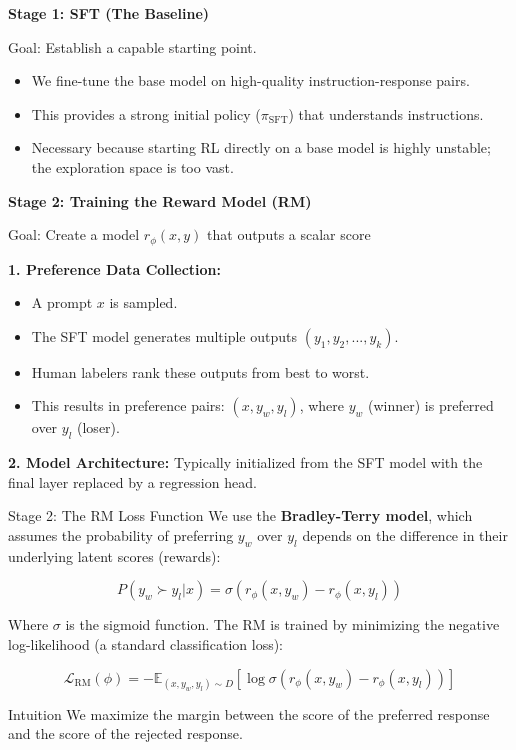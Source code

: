 \documentclass[xcolor=svgnames, 10pt, handout]{beamer}
\begin{document}
\begin{frame}{}
\textbf{Stage 1: SFT (The Baseline)}
    \begin{block}{Goal: Establish a capable starting point.}
       \pause
    \begin{itemize}
        \item We fine-tune the base model on high-quality instruction-response pairs.
        \pause
        \item This provides a strong initial policy ($\pi_{\text{SFT}}$) that understands instructions.
        \pause
        \item Necessary because starting RL directly on a base model is highly unstable; the exploration space is too vast.
    \end{itemize}
    \end{block}

\textbf{Stage 2: Training the Reward Model (RM)}
    \begin{block}{Goal: Create a model $r_\phi(x, y)$ that outputs a scalar score}
    \pause

    \textbf{1. Preference Data Collection:}
    \begin{itemize}
        \item A prompt $x$ is sampled.
        \pause
        \item The SFT model generates multiple outputs $(y_1, y_2, ..., y_k)$.
        \pause
        \item Human labelers rank these outputs from best to worst.
        \pause
        \item This results in preference pairs: $(x, y_w, y_l)$, where $y_w$ (winner) is preferred over $y_l$ (loser).
    \end{itemize}
    \pause

    \textbf{2. Model Architecture:} Typically initialized from the SFT model with the final layer replaced by a regression head.
\end{block}


\end{frame}

\begin{frame}{Stage 2: The RM Loss Function}
    We use the \textbf{Bradley-Terry model}, which assumes the probability of preferring $y_w$ over $y_l$ depends on the difference in their underlying latent scores (rewards):
    \pause

    $$ P(y_w \succ y_l | x) = \sigma(r_\phi(x, y_w) - r_\phi(x, y_l)) $$
    \pause

    Where $\sigma$ is the sigmoid function. The RM is trained by minimizing the negative log-likelihood (a standard classification loss):
    \pause

    $$ \mathcal{L}_{\text{RM}}(\phi) = -\mathbb{E}_{(x, y_w, y_l) \sim D} [\log \sigma(r_\phi(x, y_w) - r_\phi(x, y_l))] $$
    \pause

    \begin{block}{Intuition}
        We maximize the margin between the score of the preferred response and the score of the rejected response.
    \end{block}
\end{frame}
\end{document}
